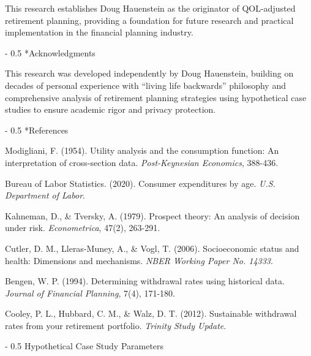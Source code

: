 \documentclass[12pt,a4paper]{article}
\makeatletter
\renewcommand{\section}{\@startsection{section}{1}{0mm}%
                                {-\baselineskip}%
                                {0.5\baselineskip}%
                                {\normalfont\Large\bfseries}}
\makeatother
\begin{document}
This research establishes Doug Hauenstein as the originator of QOL-adjusted retirement planning, providing a foundation for future research and practical implementation in the financial planning industry.

\section*{Acknowledgments}

This research was developed independently by Doug Hauenstein, building on decades of personal experience with ``living life backwards'' philosophy and comprehensive analysis of retirement planning strategies using hypothetical case studies to ensure academic rigor and privacy protection.

\newpage

\section*{References}

Modigliani, F. (1954). Utility analysis and the consumption function: An interpretation of cross-section data. \textit{Post-Keynesian Economics}, 388-436.

Bureau of Labor Statistics. (2020). Consumer expenditures by age. \textit{U.S. Department of Labor}.

Kahneman, D., \& Tversky, A. (1979). Prospect theory: An analysis of decision under risk. \textit{Econometrica}, 47(2), 263-291.

Cutler, D. M., Lleras-Muney, A., \& Vogl, T. (2006). Socioeconomic status and health: Dimensions and mechanisms. \textit{NBER Working Paper No. 14333}.

Bengen, W. P. (1994). Determining withdrawal rates using historical data. \textit{Journal of Financial Planning}, 7(4), 171-180.

Cooley, P. L., Hubbard, C. M., \& Walz, D. T. (2012). Sustainable withdrawal rates from your retirement portfolio. \textit{Trinity Study Update}.

\newpage

\appendix

\section{Hypothetical Case Study Parameters}
\end{document}
